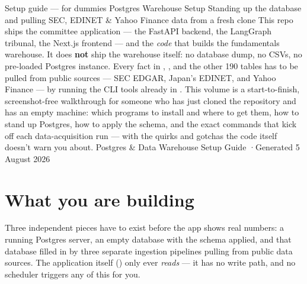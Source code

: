\documentclass[11pt]{article}
\begin{document}
\mzqatitlepage
  {Setup guide --- for dummies}
  {Postgres Warehouse Setup}
  {Standing up the database and pulling SEC, EDINET \& Yahoo Finance data from a fresh clone}
  {This repo ships the committee application --- the FastAPI backend, the LangGraph
   tribunal, the Next.js frontend --- and the \emph{code} that builds the fundamentals
   warehouse. It does \textbf{not} ship the warehouse itself: no database dump, no CSVs,
   no pre-loaded Postgres instance. Every fact in ,
   , and the other 190 tables has to be pulled from public sources
   --- SEC EDGAR, Japan's EDINET, and Yahoo Finance --- by running the CLI tools already in
   . This volume is a start-to-finish, screenshot-free walkthrough
   for someone who has just cloned the repository and has an empty machine: which programs
   to install and where to get them, how to stand up Postgres, how to apply the schema, and
   the exact commands that kick off each data-acquisition run --- with the quirks and
   gotchas the code itself doesn't warn you about.}
  {Postgres \& Data Warehouse Setup Guide \quad·\quad Generated 5 August 2026}

\mzqatoc
\clearpage

\section{What you are building}

Three independent pieces have to exist before the app shows real numbers: a running
Postgres server, an empty  database with the schema applied, and that
database filled in by three separate ingestion pipelines pulling from public data
sources. The application itself () only ever \emph{reads} --- it has
no write path, and no scheduler triggers any of this for you.
\end{document}
